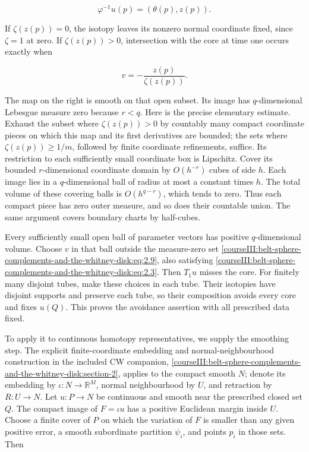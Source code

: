 \begin{equation}
\varphi^{-1}u(p)=(\theta(p),z(p)).
\label{courseIII:belt-sphere-complements-and-the-whitney-disk:eq:2.8}
\end{equation}

If \(\zeta(z(p))=0\), the isotopy leaves its nonzero normal coordinate fixed, since \(\zeta=1\) at zero. If \(\zeta(z(p))>0\), intersection with the core at time one occurs exactly when

\begin{equation}
v=-\frac{z(p)}{\zeta(z(p))}.
\label{courseIII:belt-sphere-complements-and-the-whitney-disk:eq:2.9}
\end{equation}

The map on the right is smooth on that open subset. Its image has \(q\)-dimensional Lebesgue measure zero because \(r<q\). Here is the precise elementary estimate. Exhaust the subset where \(\zeta(z(p))>0\) by countably many compact coordinate pieces on which this map and its first derivatives are bounded; the sets where \(\zeta(z(p))\geq1/m\), followed by finite coordinate refinements, suffice. Its restriction to each sufficiently small coordinate box is Lipschitz. Cover its bounded \(r\)-dimensional coordinate domain by \(O(h^{-r})\) cubes of side \(h\). Each image lies in a \(q\)-dimensional ball of radius at most a constant times \(h\). The total volume of these covering balls is \(O(h^{q-r})\), which tends to zero. Thus each compact piece has zero outer measure, and so does their countable union. The same argument covers boundary charts by half-cubes.

Every sufficiently small open ball of parameter vectors has positive \(q\)-dimensional volume. Choose \(v\) in that ball outside the measure-zero set \eqref{courseIII:belt-sphere-complements-and-the-whitney-disk:eq:2.9}, also satisfying \eqref{courseIII:belt-sphere-complements-and-the-whitney-disk:eq:2.3}. Then \(T_1u\) misses the core. For finitely many disjoint tubes, make these choices in each tube. Their isotopies have disjoint supports and preserve each tube, so their composition avoids every core and fixes \(u(Q)\). This proves the avoidance assertion with all prescribed data fixed.

To apply it to continuous homotopy representatives, we supply the smoothing step. The explicit finite-coordinate embedding and normal-neighbourhood construction in the included CW companion, \cref{courseIII:belt-sphere-complements-and-the-whitney-disk:section-2}, applies to the compact smooth \(N\); denote its embedding by \(\iota:N\to\mathbb R^M\), normal neighbourhood by \(U\), and retraction by \(R:U\to N\). Let \(u:P\to N\) be continuous and smooth near the prescribed closed set \(Q\). The compact image of \(F=\iota u\) has a positive Euclidean margin inside \(U\). Choose a finite cover of \(P\) on which the variation of \(F\) is smaller than any given positive error, a smooth subordinate partition \(\psi_i\), and points \(p_i\) in those sets. Then

